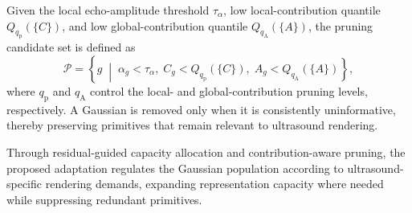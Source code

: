 Given the local echo-amplitude threshold $\tau_{\alpha}$, low local-contribution
quantile $Q_{q_{\mathrm p}}(\{C\})$, and low global-contribution quantile
$Q_{q_{\mathrm A}}(\{A\})$, the pruning candidate set is defined as
\begin{equation}
\mathcal P
=
\left\{
g
\;\middle|\;
\alpha_g<\tau_{\alpha},\;
C_g<Q_{q_{\mathrm p}}(\{C\}),\;
A_g<Q_{q_{\mathrm A}}(\{A\})
\right\},
\label{eq:path-aware-pruning}
\end{equation}
where $q_{\mathrm p}$ and $q_{\mathrm A}$ control the local- and
global-contribution pruning levels, respectively. 
A Gaussian is removed only when it is consistently uninformative, thereby
preserving primitives that remain relevant to ultrasound rendering. 

Through residual-guided capacity allocation and contribution-aware pruning, the
proposed adaptation regulates the Gaussian population according to
ultrasound-specific rendering demands, expanding representation capacity where
needed while suppressing redundant primitives.